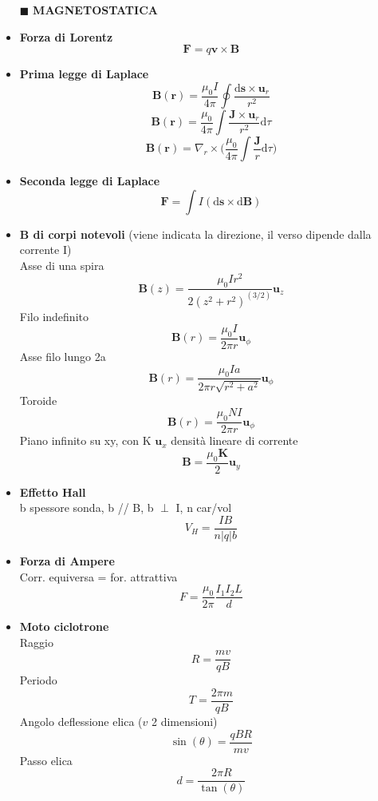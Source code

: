 \documentclass{book}
\newcommand{\g}{\textbf}
\newcommand{\h}{\mathbf}
\newcommand{\e}{\begin{equation}}
\newcommand{\ex}{\end{equation} }
\renewcommand{\it}{\item[$\cdot$]}
\begin{document}
\begin{multicols}{4}
\begin{itemize}
\item [$\blacksquare$] \g{MAGNETOSTATICA}
    \it \g{Forza di Lorentz}
        \e{\h{F}=q\h{v}\times\h{B}}\ex
    \it \g{Prima legge di Laplace}
        \e{\h{B}(\h{r})=\frac{\mu_0 I}{4\pi}\oint\frac{\mathrm{d}\h{s}\times\h{u}_r}{r^2}} \ex
        \e{\h{B}(\h{r})=\frac{\mu_0}{4\pi}\int\frac{\h{J}\times\h{u}_r}{r^2} \mathrm{d}\tau} \ex
        \e{\h{B}(\h{r})=\nabla_r\times\biggl(\frac{\mu_0}{4\pi}\int\frac{\h{J}}{r}\mathrm{d}\tau\biggr)} \ex
    \it \g{Seconda legge di Laplace}
        \e{\h{F}=\int I(\mathrm{d}\h{s}\times \mathrm{d}\h{B})} \ex
    \it \g{B di corpi notevoli} (viene indicata la direzione, il verso dipende dalla corrente I) \\
        Asse di una spira
        \e{\h{B}(z)=\frac{\mu_0Ir^2}{2(z^2+r^2)^(3/2)}\h{u}_z} \ex
        Filo indefinito
        \e{\h{B}(r)=\frac{\mu_0I}{2\pi r}\h{u}_\phi} \ex
        Asse filo lungo 2a
        \e{\h{B}(r)=\frac{\mu_0Ia}{2\pi r \sqrt{r^2+a^2}}\h{u}_\phi} \ex
        Toroide
        \e{\h{B}(r)=\frac{\mu_0NI}{2\pi r}\h{u}_\phi} \ex
        Piano infinito su xy, con K $\h{u}_{x}$ densità lineare di corrente
        \e{\h{B}=\frac{\mu_0 \h{K}}{2}\h{u}_y} \ex
    \it \g{Effetto Hall} \\
        b spessore sonda, b // B, b $\perp$ I, n car/vol
        \e{V_H=\frac{IB}{n|q|b}} \ex
    \it \g{Forza di Ampere} \\
        Corr. equiversa = for. attrattiva 
        \e{F = \frac{\mu_0}{2\pi} \frac{I_1 I_2 L}{d}}\ex
    \it \g{Moto ciclotrone} \\
        Raggio
        \e{R = \frac{mv}{qB}}\ex 
        Periodo 
        \e{T = \frac{2\pi m}{qB}}\ex 
        Angolo deflessione elica ($v$ 2 dimensioni) 
        \e{\sin(\theta) = \frac{qBR}{mv}}\ex 
        Passo elica 
        \e{d=\frac{2\pi R}{\tan(\theta)}} \ex


\end{itemize}
\end{multicols}
\end{document}
